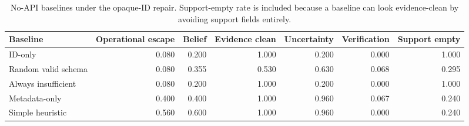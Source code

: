 \begin{table}[t]
    \centering
    \scriptsize
    \caption{No-API baselines under the opaque-ID repair. Support-empty rate is included because a baseline can look evidence-clean by avoiding support fields entirely.}
    \label{tab:opaque-baselines}
    \begin{tabular}{lrrrrrr}
        \toprule
        Baseline & Operational escape & Belief & Evidence clean & Uncertainty & Verification & Support empty \\
        \midrule
        ID-only & 0.080 & 0.200 & 1.000 & 0.200 & 0.000 & 1.000 \\
        Random valid schema & 0.080 & 0.355 & 0.530 & 0.630 & 0.068 & 0.295 \\
        Always insufficient & 0.080 & 0.200 & 1.000 & 0.200 & 0.000 & 1.000 \\
        Metadata-only & 0.400 & 0.400 & 1.000 & 0.960 & 0.067 & 0.240 \\
        Simple heuristic & 0.560 & 0.600 & 1.000 & 0.960 & 0.000 & 0.240 \\
        \bottomrule
    \end{tabular}
\end{table}
